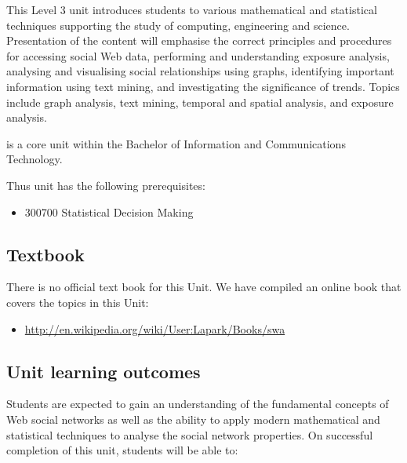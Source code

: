 \documentclass{uws_learning_guide}
\begin{document}
This Level 3 unit introduces students to various mathematical and
statistical techniques supporting the study of computing, engineering
and science. Presentation of the content will emphasise the correct
principles and procedures for accessing social Web data, performing
and understanding exposure analysis, analysing and visualising social
relationships using graphs, identifying important information using
text mining, and investigating the significance of trends. Topics
include graph analysis, text mining, temporal and spatial analysis,
and exposure analysis.


\printunitname{} is a core unit within the Bachelor of Information and
Communications Technology. 

Thus unit has the following prerequisites:
\begin{itemize}
\item 300700 Statistical Decision Making
\end{itemize}



\subsection{Textbook}


There is no official text book for this Unit. We have compiled an
online book that covers the topics in this Unit:
\begin{itemize}
\item \url{http://en.wikipedia.org/wiki/User:Lapark/Books/swa}
\end{itemize}



\subsection{Unit learning outcomes}


Students are expected to gain an understanding of the fundamental
concepts of Web social networks as well as the ability to apply modern
mathematical and statistical techniques to analyse the social network
properties.  On successful completion of this unit, students will be
able to:
\end{document}

